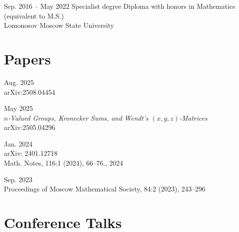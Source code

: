 \documentclass[11pt,letterpaper]{report}
\begin{document}
    \begin{tablist}

        \item[Sep. 2016 -- May 2022]  \tab{}Specialist degree Diploma with honors in Mathematics (equivalent to M.S.)\\ Lomonosov Moscow State University 

    \end{tablist}
    
    
    
    
    
    
      \section*{Papers}

    \begin{tablist}
	
	\item[Aug. 2025] \\ 	arXiv:2508.04454
	\item[May 2025] \\ {\it $n$-Valued Groups, Kronecker Sums, and Wendt's $(x, y, z)$-Matrices}\\ arXiv:2505.04296
        \item[Jan. 2024] \\ arXiv: 2401.12718\\ Math. Notes, 116:1 (2024), 66–76., 2024
        \item[Sep. 2023] \\ Proceedings of Moscow Mathematical Society, 84:2 (2023),  243–296
        
    \end{tablist}
    
    
        
    
    
    
    
    
     \section*{Conference Talks}
\end{document}
